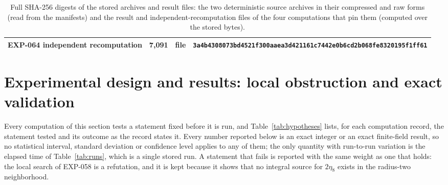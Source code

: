 \documentclass[11pt]{article}
\theoremstyle{definition}
\theoremstyle{remark}
\begin{document}
\begin{table}[t]
\begin{tabular}{>{\raggedright\arraybackslash}p{}rl>{\raggedright\arraybackslash}p{}}
EXP-064 independent recomputation & 7,091 & file & \texttt{\scriptsize 3a4b4308073bd452\allowbreak 1f300aaea3d42116\allowbreak 1c7442e0b6cd2b06\allowbreak 8fe8320195f1ff61}\\[2pt]
\bottomrule
\end{tabular}
\caption{Full SHA-256 digests of the stored archives and result files: the two deterministic source archives in their compressed and
raw forms (read from the manifests) and the result and independent-recomputation files of the four computations that pin them
(computed over the stored bytes).}
\label{tab:hashes}
\end{table}

\section{Experimental design and results: local obstruction and exact validation}\label{sec:validation}

Every computation of this section tests a statement fixed before it is run, and
Table~\ref{tab:hypotheses} lists, for each computation record, the statement tested and
its outcome as the record states it. Every number reported below is an exact integer
or an exact finite-field result, so no statistical interval, standard deviation or
confidence level applies to any of them; the only quantity with run-to-run variation is the
elapsed time of Table~\ref{tab:runs}, which is a single stored run. A statement that fails
is reported with the same weight as one that holds: the local search of
EXP-058 is a refutation, and it is kept because it shows that no integral source for
$2\eta_8$ exists in the radius-two neighborhood.
\end{document}
